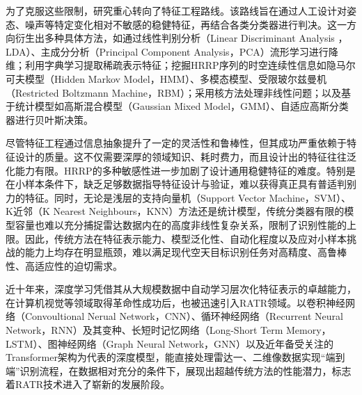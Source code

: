 为了克服这些限制，研究重心转向了特征工程路线。该路线旨在通过人工设计对姿态、噪声等特定变化相对不敏感的稳健特征，再结合各类分类器进行判决。这一方向衍生出多种具体方法，如通过线性判别分析（Linear Discriminant Analysis ，LDA）、主成分分析（Principal Component Analysis，PCA）流形学习进行降维；利用字典学习提取稀疏表示特征；挖掘HRRP序列的时空连续性信息如隐马尔可夫模型（Hidden Markov Model，HMM）、多模态模型、受限玻尔兹曼机（Restricted Boltzmann Machine，RBM）；采用核方法处理非线性问题；以及基于统计模型如高斯混合模型（Gaussian Mixed Model，GMM）、自适应高斯分类器进行贝叶斯决策。

尽管特征工程通过信息抽象提升了一定的灵活性和鲁棒性，但其成功严重依赖于特征设计的质量。这不仅需要深厚的领域知识、耗时费力，而且设计出的特征往往泛化能力有限。HRRP的多种敏感性进一步加剧了设计通用稳健特征的难度。特别是在小样本条件下，缺乏足够数据指导特征设计与验证，难以获得真正具有普适判别力的特征。同时，无论是浅层的支持向量机（Support Vector Machine，SVM）、K近邻（K Nearest Neighbours，KNN）方法还是统计模型，传统分类器有限的模型容量也难以充分捕捉雷达数据内在的高度非线性复杂关系，限制了识别性能的上限。因此，传统方法在特征表示能力、模型泛化性、自动化程度以及应对小样本挑战的能力上均存在明显瓶颈，难以满足现代空天目标识别任务对高精度、高鲁棒性、高适应性的迫切需求。


近十年来，深度学习凭借其从大规模数据中自动学习层次化特征表示的卓越能力，在计算机视觉等领域取得革命性成功后，也被迅速引入RATR领域。以卷积神经网络（Convoultional Nerual Network，CNN）、循环神经网络（Recurrent Neural Network，RNN）及其变种、长短时记忆网络（Long-Short Term Memory，LSTM）、图神经网络（Graph Neural Network，GNN）以及近年备受关注的Transformer架构为代表的深度模型，能直接处理雷达一、二维像数据实现“端到端”识别流程，在数据相对充分的条件下，展现出超越传统方法的性能潜力，标志着RATR技术进入了崭新的发展阶段。

